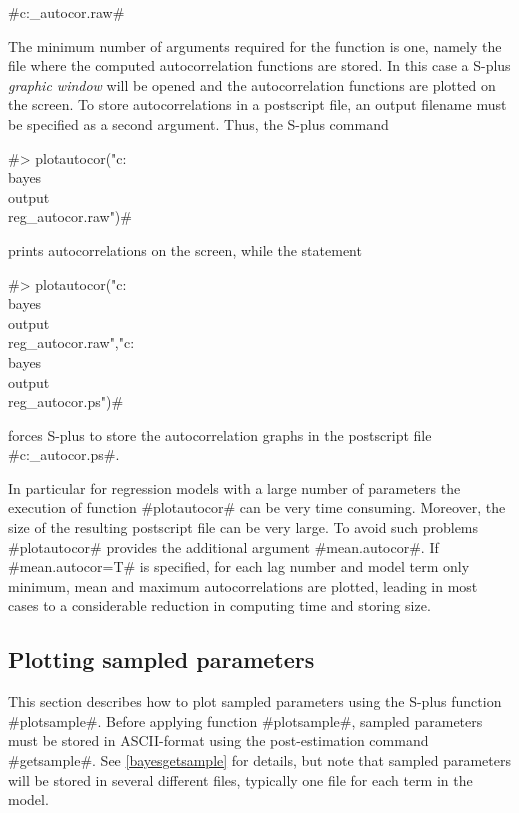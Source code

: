 #c:\bayes\output\reg_autocor.raw#

The minimum number of arguments required for the function is one,
namely the file where the computed autocorrelation functions are
stored. In this case a S-plus {\em graphic window} will be opened
and the autocorrelation functions are plotted on the screen. To
store autocorrelations in a postscript file, an output filename
must be specified as a second argument. Thus, the S-plus command

#> plotautocor("c:\\bayes\\output\\reg_autocor.raw")#

prints autocorrelations on the screen, while the statement

 #> plotautocor("c:\\bayes\\output\\reg_autocor.raw","c:\\bayes\\output\\reg_autocor.ps")#

forces S-plus to store the autocorrelation graphs in the
postscript file #c:\bayes\output\reg_autocor.ps#.

In particular for regression models with a large number of
parameters the execution of function #plotautocor# can be very time
consuming. Moreover, the size of the resulting postscript file can
be very large. To avoid such problems #plotautocor# provides the
additional argument #mean.autocor#. If #mean.autocor=T# is
specified, for each lag number and model term only minimum, mean and
maximum autocorrelations are plotted, leading in most cases to a
considerable reduction in computing time and storing size.

\subsection{Plotting sampled parameters} \label{splusplotsample}
 

This section describes how to plot sampled parameters using the
S-plus function #plotsample#. Before applying function
#plotsample#, sampled parameters must be stored in ASCII-format
using the post-estimation command #getsample#. See
\autoref{bayesgetsample} for details, but note that sampled
parameters will be stored in several different files, typically
one file for each term in the model.


